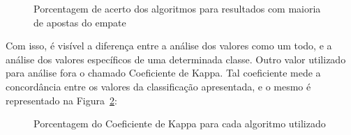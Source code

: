 \documentclass[thesis]{hmcposter}
\begin{document}
\begin{poster}
\begin{figure}
\begin{center}
\caption{Porcentagem de acerto dos algoritmos para resultados com maioria de apostas do empate}%
\label{fig:empate-algoritmo}
\end{center}
\end{figure}

Com isso, é visível a diferença entre a análise dos valores como um todo, e a análise dos valores específicos de uma determinada classe. Outro valor utilizado para análise fora o chamado Coeficiente de Kappa. Tal coeficiente mede a concordância entre os valores da classificação apresentada, e o mesmo é representado na Figura~\ref{fig:kappa-algoritmo}:

\begin{figure}
\begin{center}
\caption{Porcentagem do Coeficiente de Kappa para cada algoritmo utilizado}%
\label{fig:kappa-algoritmo}
\end{center}
\end{figure}


\end{poster}
\end{document}
